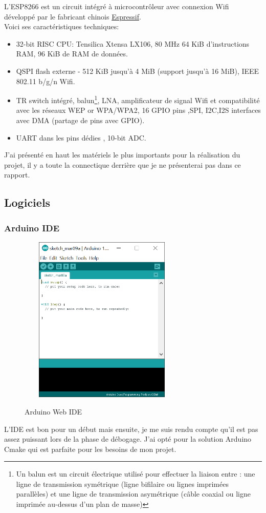 L’ESP8266 est un circuit intégré à microcontrôleur avec connexion Wifi développé par le fabricant chinois \href{https://espressif.com/}{Espressif}.\\
Voici ses caractéristiques techniques:\\
\begin{itemize}

\item 32-bit RISC CPU: Tensilica Xtensa LX106, 80 MHz 64 KiB d’instructions RAM, 96 KiB de RAM de données.
\item QSPI flash externe - 512 KiB jusqu’à 4 MiB (support jusqu’à 16 MiB), IEEE 802.11 b/g/n Wifi.
\item TR switch intégré, balun\footnote{Un balun est un circuit électrique utilisé pour effectuer la liaison entre : une ligne de transmission symétrique (ligne bifilaire ou lignes imprimées parallèles) et une ligne de transmission asymétrique (câble coaxial ou ligne imprimée au-dessus d'un plan de masse)}, LNA, amplificateur de signal Wifi et compatibilité avec les réseaux WEP or WPA/WPA2, 16 GPIO pins ,SPI, I2C,I2S interfaces avec DMA (partage de pins avec GPIO).
\item UART dans les pins dédies , 10-bit ADC.
\end{itemize}

J’ai présenté en haut les matériels le plus importants pour la réalisation du projet, il y a toute la connectique derrière que je ne présenterai pas dans ce rapport.


\subsection{Logiciels}

\subsubsection{Arduino IDE}

\begin{figure}[H]
  \centering
  \href{https://www.arduino.cc/en/main/software}{
  \includegraphics[width=8cm,height=8cm]{image/arduino_ide.png}
  }
  \caption{Arduino Web IDE}
\end{figure}
L'IDE est bon pour un début mais ensuite, je me suis rendu compte qu'il est pas assez puissant lors de la phase de débogage.
J'ai opté pour  la solution Arduino Cmake qui est parfaite pour les besoins de mon projet.

